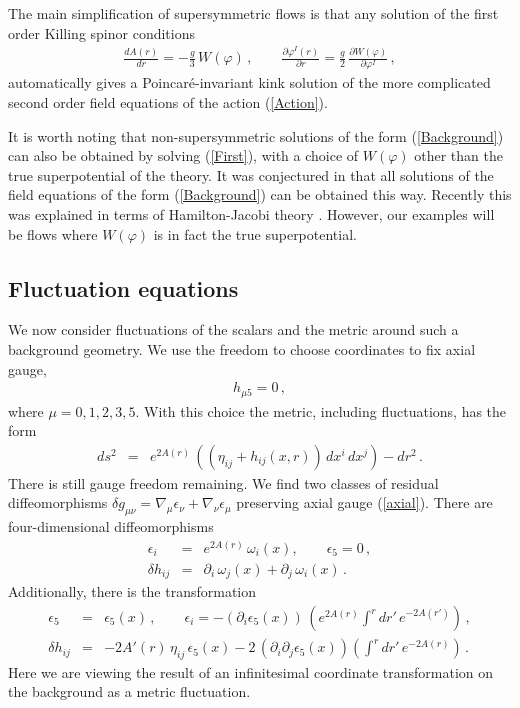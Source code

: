 \documentclass[a4paper,12pt]{article}
\begin{document}
The main simplification of supersymmetric flows is that any solution
of the first order Killing spinor conditions \cite{fgpw1} 
\begin{eqnarray}
\label{First}
\frac{dA(r)}{dr} = - \frac{g}{3} \, W(\varphi) \,, \quad \quad
 \frac{\partial \varphi^I(r)}{\partial r} = \frac{g}{2} \,
 \frac{\partial W(\varphi)}{\partial \varphi^I} \,,
\end{eqnarray}
automatically gives a Poincar\'e-invariant kink solution of the more
complicated second order field equations of the action (\ref{Action}).

It is worth noting that non-supersymmetric solutions of the form
(\ref{Background}) can also be obtained by solving (\ref{First}), with
a choice of $W(\varphi)$ other than the true superpotential of the
theory.  It was conjectured in \cite{dfgk} that all solutions of the
field equations of the form (\ref{Background}) can be obtained this
way.  Recently this was explained in terms of Hamilton-Jacobi theory
\cite{dbvv}.  However, our examples will be flows where $W(\varphi)$
is in fact the true superpotential.


\subsection{Fluctuation equations}


We now consider fluctuations of the scalars and the metric
around such a background geometry.  We use the freedom to choose
coordinates to fix axial gauge,
\begin{eqnarray}
\label{axial}
h_{\mu 5} = 0 \,,
\end{eqnarray}
where $\mu = 0,1,2,3,5$.  With this choice the metric, including
fluctuations, has the form
\begin{eqnarray}
ds^2 &=& e^{2 A(r)} \, \left( (\eta_{ij} + h_{ij}(x, r)) \, dx^i \, dx^j \right) - dr^2 \,. 
\end{eqnarray}
There is still gauge freedom remaining.  We find two classes of
residual diffeomorphisms $\delta g_{\mu \nu} = \nabla_{\mu}
\epsilon_{\nu} + \nabla_{\nu} \epsilon_{\mu}$ preserving axial gauge
(\ref{axial}). There are four-dimensional diffeomorphisms
\begin{eqnarray}
\label{4ddiffeo}
\epsilon_{i} &=& e^{2A(r)} \, \omega_i(x), \quad \quad \epsilon_5 = 0
\,, \\ \delta h_{ij} &=&  \partial_i \, \omega_j(x) +
\partial_j \, \omega_i(x) \,. \nonumber
\end{eqnarray}
Additionally, there is the transformation \cite{tanaka, gkr}
\begin{eqnarray}
\label{diffeo}
\epsilon_5 &=& \epsilon_5(x) \,, \quad \quad \epsilon_i = -
 (\partial_i \epsilon_5(x) )\, \left(e^{2A(r)} \int^r dr' \, e^{-2A(r')}
 \right) \,, \\ \delta h_{ij} &=& - 2 A'(r) \, \eta_{ij} \, \epsilon_5(x) - 2 \, (\partial_i \partial_j \epsilon_5(x)) \left( \int^r dr' \, e^{-2A(r)} \right) \,. \nonumber
\end{eqnarray}
Here we are viewing the result of an infinitesimal coordinate
transformation on the background as a metric fluctuation.
\end{document}
